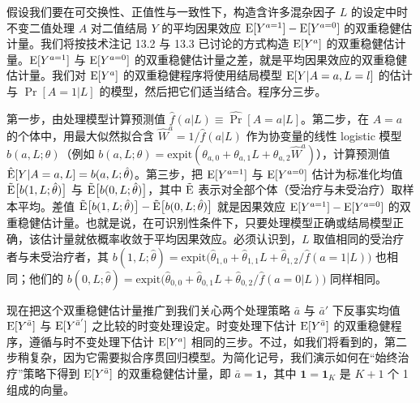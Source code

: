 
假设我们要在可交换性、正值性与一致性下，构造含许多混杂因子 $L$ 的设定中时不变二值处理 $A$ 对二值结局 $Y$ 的平均因果效应 $\mathrm{E}[Y^{a=1}]-\mathrm{E}[Y^{a=0}]$ 的双重稳健估计量。我们将按技术注记 13.2 与 13.3 已讨论的方式构造 $\mathrm{E}[Y^a]$ 的双重稳健估计量。$\mathrm{E}[Y^{a=1}]$ 与 $\mathrm{E}[Y^{a=0}]$ 的双重稳健估计量之差，就是平均因果效应的双重稳健估计量。我们对 $\mathrm{E}[Y^a]$ 的双重稳健程序将使用结局模型 $\mathrm{E}[Y|A=a,L=l]$ 的估计与 $\Pr[A=1|L]$ 的模型，然后把它们适当结合。程序分三步。

第一步，由处理模型计算预测值 $\hat f(a|L)\equiv\widehat{\Pr}[A=a|L]$。第二步，在 $A=a$ 的个体中，用最大似然拟合含 $\hat W^a=1/\hat f(a|L)$ 作为协变量的线性 logistic 模型 $b(a,L;\theta)$（例如 $b(a,L;\theta)=\mathrm{expit}(\theta_{a,0}+\theta_{a,1}L+\theta_{a,2}\hat W^a)$），计算预测值 $\hat{\mathrm{E}}[Y|A=a,L]=b(a,L;\hat\theta)$。第三步，把 $\mathrm{E}[Y^{a=1}]$ 与 $\mathrm{E}[Y^{a=0}]$ 估计为标准化均值 $\tilde{\mathrm{E}}\big[b(1,L;\hat\theta)\big]$ 与 $\tilde{\mathrm{E}}\big[b(0,L;\hat\theta)\big]$，其中 $\tilde{\mathrm{E}}$ 表示对全部个体（受治疗与未受治疗）取样本平均。差值 $\tilde{\mathrm{E}}\big[b(1,L;\hat\theta)\big]-\tilde{\mathrm{E}}\big[b(0,L;\hat\theta)\big]$ 就是因果效应 $\mathrm{E}[Y^{a=1}]-\mathrm{E}[Y^{a=0}]$ 的双重稳健估计量。也就是说，在可识别性条件下，只要处理模型正确或结局模型正确，该估计量就依概率收敛于平均因果效应。必须认识到，$L$ 取值相同的受治疗者与未受治疗者，其 $b(1,L;\hat\theta)=\mathrm{expit}\big(\hat\theta_{1,0}+\hat\theta_{1,1}L+\hat\theta_{1,2}/\hat f(a=1|L)\big)$ 也相同；他们的 $b(0,L;\hat\theta)=\mathrm{expit}\big(\hat\theta_{0,0}+\hat\theta_{0,1}L+\hat\theta_{0,2}/\hat f(a=0|L)\big)$ 同样相同。


现在把这个双重稳健估计量推广到我们关心两个处理策略 $\bar a$ 与 $\bar a'$ 下反事实均值 $\mathrm{E}[Y^{\bar a}]$ 与 $\mathrm{E}[Y^{\bar a'}]$ 之比较的时变处理设定。时变处理下估计 $\mathrm{E}[Y^{\bar a}]$ 的双重稳健程序，遵循与时不变处理下估计 $\mathrm{E}[Y^a]$ 相同的三步。不过，如我们将看到的，第二步稍复杂，因为它需要拟合序贯回归模型。为简化记号，我们演示如何在“始终治疗”策略下得到 $\mathrm{E}[Y^{\bar a}]$ 的双重稳健估计量，即 $\bar a=\mathbf{1}$，其中 $\mathbf{1}=\mathbf{1}_K$ 是 $K+1$ 个 1 组成的向量。

